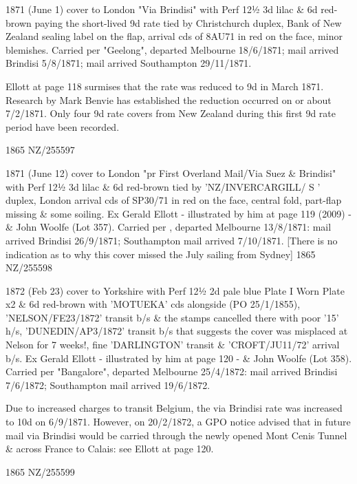 \documentclass[justified]{tufte-book}
\begin{document}
%
{1871 (June 1) cover to London "Via Brindisi" with Perf 12½ 3d lilac \& 6d red-brown paying the short-lived 9d rate tied by Christchurch duplex, Bank of New Zealand sealing label on the flap, arrival cds of 8AU71 in red on the face, minor blemishes. Carried per "Geelong", departed Melbourne 18/6/1871; mail arrived Brindisi 5/8/1871; mail arrived Southampton 29/11/1871.

Ellott at page 118 surmises that the rate was reduced to 9d in March 1871. Research by Mark Benvie has established the reduction occurred on or about 7/2/1871. Only four 9d rate covers from New Zealand during this first 9d rate period have been recorded.}%
{1865}%
{NZ/255597}%
{}%
{}
{}%
{}%

%
{1871 (June 12) cover to London "pr First Overland Mail/Via Suez \& Brindisi" with Perf 12½ 3d lilac \& 6d red-brown tied by 'NZ/INVERCARGILL/ S ' duplex, London arrival cds of SP30/71 in red on the face, central fold, part-flap missing \& some soiling. Ex Gerald Ellott - illustrated by him at page 119 (2009) - \& John Woolfe (Lot 357). Carried per , departed Melbourne 13/8/1871: mail arrived Brindisi 26/9/1871; Southampton mail arrived 7/10/1871. [There is no indication as to why this cover missed the July sailing from Sydney]}%
{1865}%
{NZ/255598}%
{}%
{}
{}%
{}%

%
{1872 (Feb 23) cover to Yorkshire with Perf 12½ 2d pale blue Plate I Worn Plate x2 \& 6d red-brown with 'MOTUEKA' cds alongside (PO 25/1/1855), 'NELSON/FE23/1872' transit b/s \& the stamps cancelled there with poor '15' h/s, 'DUNEDIN/AP3/1872' transit b/s that suggests the cover was misplaced at Nelson for 7 weeks!, fine 'DARLINGTON' transit \& 'CROFT/JU11/72' arrival b/s. Ex Gerald Ellott - illustrated by him at page 120 - \& John Woolfe (Lot 358). Carried per "Bangalore", departed Melbourne 25/4/1872: mail arrived Brindisi 7/6/1872; Southampton mail arrived 19/6/1872.

Due to increased charges to transit Belgium, the via Brindisi rate was increased to 10d on 6/9/1871. However, on 20/2/1872, a GPO notice advised that in future mail via Brindisi would be carried through the newly opened Mont Cenis Tunnel \& across France to Calais: see Ellott at page 120.}%
{1865}%
{NZ/255599}%
{}%
{}
{}%
{}%
\end{document}
